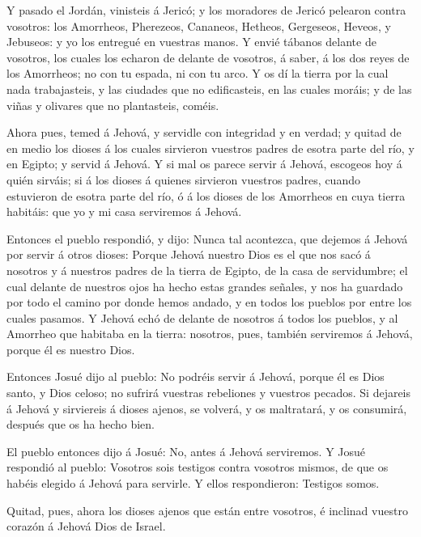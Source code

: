  Y pasado el Jordán, vinisteis á Jericó; y los moradores de
Jericó pelearon contra vosotros: los Amorrheos, Pherezeos, Cananeos,
Hetheos, Gergeseos, Heveos, y Jebuseos: y yo los entregué en vuestras
manos.  Y envié tábanos delante de vosotros, los cuales los
echaron de delante de vosotros, á saber, á los dos reyes de los
Amorrheos; no con tu espada, ni con tu arco.  Y os dí la
tierra por la cual nada trabajasteis, y las ciudades que no
edificasteis, en las cuales moráis; y de las viñas y olivares que no
plantasteis, coméis.

 Ahora pues, temed á Jehová, y servidle con integridad y en
verdad; y quitad de en medio los dioses á los cuales sirvieron vuestros
padres de esotra parte del río, y en Egipto; y servid á Jehová.
 Y si mal os parece servir á Jehová, escogeos hoy á quién
sirváis; si á los dioses á quienes sirvieron vuestros padres, cuando
estuvieron de esotra parte del río, ó á los dioses de los Amorrheos en
cuya tierra habitáis: que yo y mi casa serviremos á Jehová.

 Entonces el pueblo respondió, y dijo: Nunca tal acontezca,
que dejemos á Jehová por servir á otros dioses:  Porque
Jehová nuestro Dios es el que nos sacó á nosotros y á nuestros padres de
la tierra de Egipto, de la casa de servidumbre; el cual delante de
nuestros ojos ha hecho estas grandes señales, y nos ha guardado por todo
el camino por donde hemos andado, y en todos los pueblos por entre los
cuales pasamos.  Y Jehová echó de delante de nosotros á
todos los pueblos, y al Amorrheo que habitaba en la tierra: nosotros,
pues, también serviremos á Jehová, porque él es nuestro Dios.

 Entonces Josué dijo al pueblo: No podréis servir á Jehová,
porque él es Dios santo, y Dios celoso; no sufrirá vuestras rebeliones y
vuestros pecados.  Si dejareis á Jehová y sirviereis á
dioses ajenos, se volverá, y os maltratará, y os consumirá, después que
os ha hecho bien.

 El pueblo entonces dijo á Josué: No, antes á Jehová
serviremos.  Y Josué respondió al pueblo: Vosotros sois
testigos contra vosotros mismos, de que os habéis elegido á Jehová para
servirle. Y ellos respondieron: Testigos somos.

 Quitad, pues, ahora los dioses ajenos que están entre
vosotros, é inclinad vuestro corazón á Jehová Dios de Israel.

